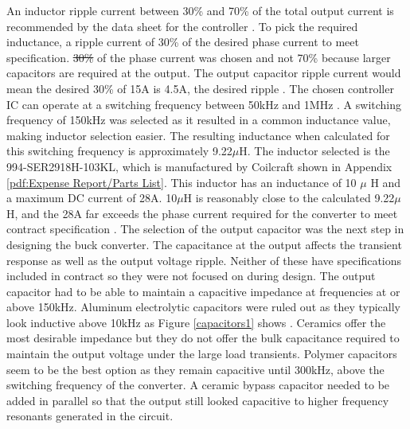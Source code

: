 \documentclass[11pt]{article}
\providecommand{\DIFadd}[1]{{\protect\color{blue}\uwave{#1}}} %
\providecommand{\DIFdel}[1]{{\protect\color{red}\sout{#1}}}                      %
\providecommand{\DIFaddbegin}{} %
\providecommand{\DIFaddend}{} %
\providecommand{\DIFdelbegin}{} %
\providecommand{\DIFdelend}{} %
\newcommand{\DIFscaledelfig}{0.5}
\newlength{\DIFdelgraphicswidth} %
\newlength{\DIFdelgraphicsheight} %
\newcommand{\DIFaddincludegraphics}[2][]{{\color{blue}\fbox{\DIFOincludegraphics[#1]{#2}}}} %
\newcommand{\DIFdelincludegraphics}[2][]{%
\sbox{\DIFdelgraphicsbox}{\DIFOincludegraphics[#1]{#2}}%
\settoboxwidth{\DIFdelgraphicswidth}{\DIFdelgraphicsbox} %
\settoboxtotalheight{\DIFdelgraphicsheight}{\DIFdelgraphicsbox} %
\scalebox{\DIFscaledelfig}{%
\parbox[b]{\DIFdelgraphicswidth}{\usebox{\DIFdelgraphicsbox}\\[-\baselineskip] \rule{\DIFdelgraphicswidth}{0em}}\llap{\resizebox{\DIFdelgraphicswidth}{\DIFdelgraphicsheight}{%
\setlength{\unitlength}{\DIFdelgraphicswidth}%
\begin{picture}(1,1)%
\thicklines\linethickness{2pt} %
{\color[rgb]{1,0,0}\put(0,0){\framebox(1,1){}}}%
{\color[rgb]{1,0,0}\put(0,0){\line( 1,1){1}}}%
{\color[rgb]{1,0,0}\put(0,1){\line(1,-1){1}}}%
\end{picture}%
}\hspace*{3pt}}} %
} %
\DeclareRobustCommand{\DIFaddbegin}{\DIFOaddbegin \let\includegraphics\DIFaddincludegraphics} %
\DeclareRobustCommand{\DIFaddend}{\DIFOaddend \let\includegraphics\DIFOincludegraphics} %
\DeclareRobustCommand{\DIFdelbegin}{\DIFOdelbegin \let\includegraphics\DIFdelincludegraphics} %
\DeclareRobustCommand{\DIFdelend}{\DIFOaddend \let\includegraphics\DIFOincludegraphics} %
\begin{document}
    \noindent An inductor ripple current between 30\% and 70\% of the total output current is recommended by the data sheet for the controller \cite{linear_technology_ltc3892:_nodate}. To pick the required inductance, a ripple current of 30\%  of the desired phase current \DIFaddbegin \DIFadd{was required }\DIFaddend to meet specification. \DIFdelbegin \DIFdel{30\% }\DIFdelend \DIFaddbegin \DIFadd{Thirty percent }\DIFaddend of the phase current was chosen and not 70\% because larger capacitors are required at the output. The output capacitor ripple current would mean the desired 30\% of 15A is 4.5A, \DIFaddbegin \DIFadd{which is }\DIFaddend the desired ripple \DIFaddbegin \DIFadd{current}\DIFaddend . The chosen controller IC can operate at a switching frequency between 50kHz and 1MHz \cite{linear_technology_ltc3892:_nodate}. A switching frequency of 150kHz was selected as it resulted in a common inductance value, making inductor selection easier. The resulting inductance when calculated for this switching frequency is approximately 9.22$\mu$H. The inductor selected is the 994-SER2918H-103KL, which is manufactured by Coilcraft shown in Appendix \ref{pdf:Expense Report/Parts List}. This inductor has an inductance of 10 $\mu$ H and a maximum DC current of 28A. 10$\mu$H is reasonably close to the calculated 9.22$\mu$ H, and the 28A far exceeds the phase current required for the converter to meet contract specification \cite{noauthor_shielded_2017}.
    \newline
    \newline 
    \noindent The selection of the output capacitor was the next step in designing the buck converter. The capacitance at the output affects the transient response as well as the output voltage ripple. Neither of these have specifications included in contract so they were not focused on during design. The output capacitor had to be able to maintain a capacitive impedance at frequencies at or above 150kHz. Aluminum electrolytic capacitors were ruled out as they typically look inductive above 10kHz as Figure \ref{capacitors1} shows \cite{kemet_charged_single-ended_2017}. Ceramics offer the most desirable impedance but they do not offer the bulk capacitance required to maintain the output voltage under the large load transients. Polymer capacitors seem to be the best option as they remain capacitive until 300kHz, above the switching frequency of the converter. A ceramic bypass capacitor needed to be added in parallel so that the output still looked capacitive to higher frequency resonants generated in the circuit.
\end{document}
